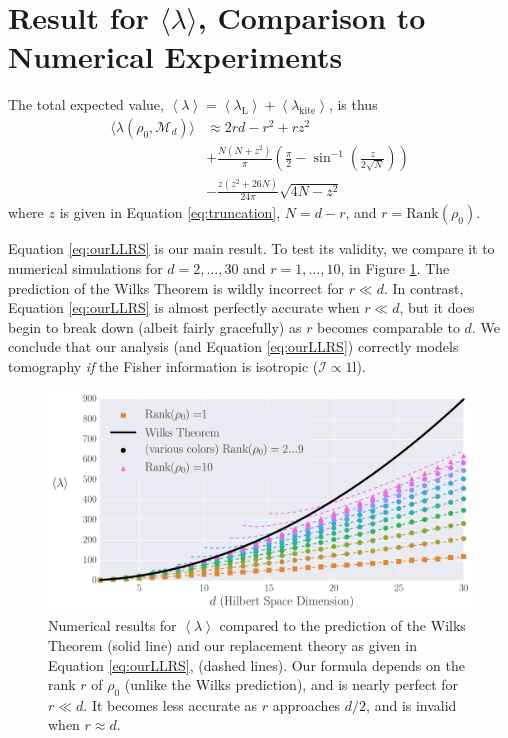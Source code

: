 \documentclass[aps,pra, twocolumn]{revtex4-1}
\newcommand{\M}{\mathcal{M}}
\newcommand{\Id}{\mathbb{I}}
\newcommand{\expect}[1]{\ensuremath{\left\langle#1\right\rangle}}
\def\Id{1\!\mathrm{l}}
\newcommand{\Fi}{\mathcal{I}}
\begin{document}
\section{Result for $\langle \lambda \rangle$, Comparison to Numerical Experiments}
The total expected value, $\expect{\lambda} = \expect{\lambda_{\mathrm{L}}} + \expect{\lambda_{\mathrm{kite}}}$, is thus
\begin{align}
\label{eq:ourLLRS}
\nonumber \langle \lambda(\rho_{0}, \M_{d}) \rangle &\approx 2rd - r^{2}+rz^{2}\\
\nonumber & + \frac{N(N+z^{2})}{\pi}\left(\frac{\pi}{2} - \sin^{-1}\left(\frac{z}{2\sqrt{N}}\right)\right) \\
& - \frac{z(z^{2}+26N)}{24\pi}\sqrt{4N-z^{2}}
\end{align}
where $z$ is given in Equation \eqref{eq:truncation}, $N=d-r$, and $r = \mathrm{Rank}(\rho_{0})$.

Equation \eqref{eq:ourLLRS} is our main result.  To test its validity, we compare it to numerical simulations for $d=2,\ldots,30$ and $r=1,\ldots,10$, in Figure \ref{fig:modelcomp-iso}.  The prediction of the Wilks Theorem is wildly incorrect for $r\ll d$. In contrast, Equation \eqref{eq:ourLLRS} is almost perfectly accurate when $r \ll d$, but it does begin to break down (albeit fairly gracefully) as $r$ becomes comparable to $d$.  We conclude that our analysis (and Equation \eqref{eq:ourLLRS}) correctly models tomography \emph{if} the Fisher information is isotropic ($\Fi \propto \Id$).

\begin{figure}[h]
 \includegraphics[width=\columnwidth]{Images/Figure_5.pdf}
 \caption{Numerical results for $\expect{\lambda}$ compared to the prediction of the Wilks Theorem (solid line) and our replacement theory as given in Equation \eqref{eq:ourLLRS}, (dashed lines).  Our formula depends on the rank $r$ of $\rho_0$ (unlike the Wilks prediction), and is nearly perfect for $r\ll d$.  It becomes less accurate as $r$ approaches $d/2$, and is invalid when $r\approx d$.}
 \label{fig:modelcomp-iso}
\end{figure}
\end{document}
